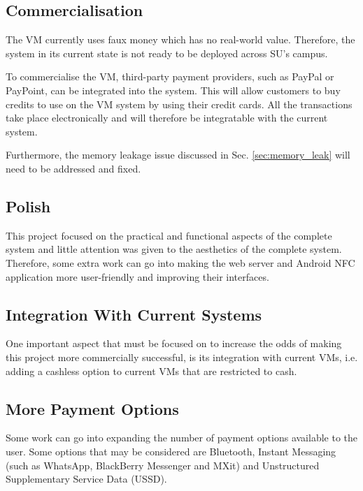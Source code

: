 \subsection{Commercialisation}

The VM currently uses faux money which has no real-world value. Therefore,
the system in its current state is not ready to be deployed across SU's campus. 

To commercialise the VM, third-party payment providers, such
as PayPal or PayPoint, can be integrated into the system. This will allow customers to
buy credits to use on the VM system by using their credit cards. All the
transactions take place electronically and will therefore be integratable with
the current system.

Furthermore, the memory leakage issue discussed in Sec. \ref{sec:memory_leak} will need
to be addressed and fixed.

\subsection{Polish}

This project focused on the practical and functional aspects of the complete
system and little attention was given to the aesthetics of the complete system.
Therefore, some extra work can go into making the web server and Android NFC
application more user-friendly and improving their interfaces.

\subsection{Integration With Current Systems}

One important aspect that must be focused on to increase the odds of making this project
more commercially successful, is its integration with current VMs, i.e.
adding a cashless option to current VMs that are restricted to cash.



\subsection{More Payment Options}

Some work can go into expanding the number of payment options available to the user.
Some options that may be considered are Bluetooth, Instant Messaging (such as WhatsApp,
BlackBerry Messenger and MXit) and Unstructured Supplementary Service Data (USSD).